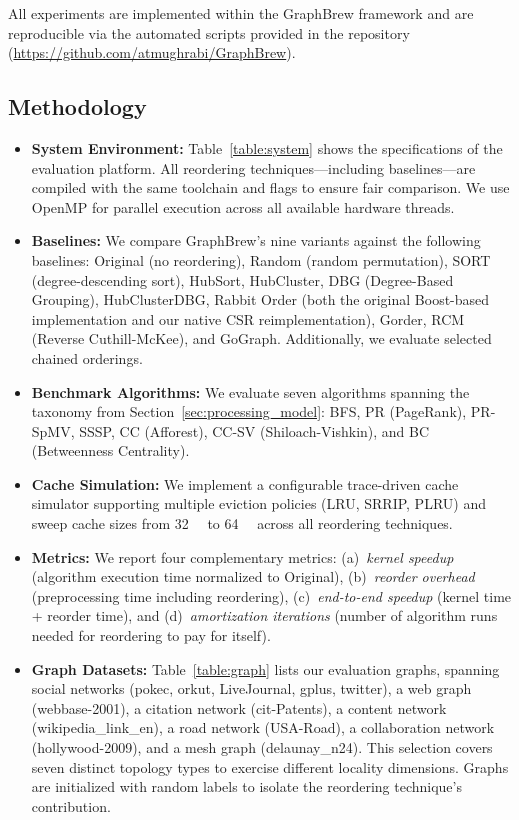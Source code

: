 \documentclass[sigconf, nonacm]{acmart}
\begin{document}
All experiments are implemented within the GraphBrew framework and are reproducible via the automated scripts provided in the repository (\url{https://github.com/atmughrabi/GraphBrew}).

\subsection{Methodology}
\begin{itemize}[topsep=2pt,itemsep=2pt,wide]
    \item \textbf{System Environment:} Table~\ref{table:system} shows the specifications of the evaluation platform. All reordering techniques---including baselines---are compiled with the same toolchain and flags to ensure fair comparison. We use OpenMP for parallel execution across all available hardware threads.

\item \textbf{Baselines:} We compare GraphBrew's nine variants against the following baselines: Original (no reordering), Random (random permutation), SORT (degree-descending sort), HubSort, HubCluster, DBG (Degree-Based Grouping), HubClusterDBG, Rabbit Order (both the original Boost-based implementation and our native CSR reimplementation), Gorder, RCM (Reverse Cuthill-McKee), and GoGraph. Additionally, we evaluate selected chained orderings.

\item \textbf{Benchmark Algorithms:} We evaluate seven algorithms spanning the taxonomy from Section~\ref{sec:processing_model}: BFS, PR (PageRank), PR-SpMV, SSSP, CC (Afforest), CC-SV (Shiloach-Vishkin), and BC (Betweenness Centrality).

\item \textbf{Cache Simulation:} We implement a configurable trace-driven cache simulator supporting multiple eviction policies (LRU, SRRIP, PLRU) and sweep cache sizes from \SI{32}{\kilo\byte} to \SI{64}{\mega\byte} across all reordering techniques.

\item \textbf{Metrics:} We report four complementary metrics: (a)~\emph{kernel speedup} (algorithm execution time normalized to Original), (b)~\emph{reorder overhead} (preprocessing time including reordering), (c)~\emph{end-to-end speedup} (kernel time + reorder time), and (d)~\emph{amortization iterations} (number of algorithm runs needed for reordering to pay for itself).
    
\item \textbf{Graph Datasets:} Table~\ref{table:graph} lists our evaluation graphs, spanning social networks (pokec, orkut, LiveJournal, gplus, twitter), a web graph (webbase-2001), a citation network (cit-Patents), a content network (wikipedia\_link\_en), a road network (USA-Road), a collaboration network (hollywood-2009), and a mesh graph (delaunay\_n24). This selection covers seven distinct topology types to exercise different locality dimensions. Graphs are initialized with random labels to isolate the reordering technique's contribution.
\end{itemize}
\end{document}
